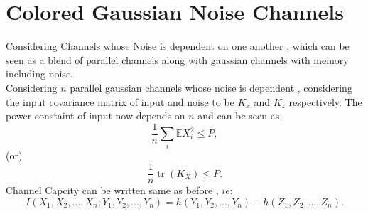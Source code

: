 \section{Colored Gaussian Noise Channels}
Considering Channels whose Noise is dependent on one another , which can be seen as a blend of parallel channels along with gaussian channels with memory including noise.
\\
Considering $n$ parallel gaussian channels whose noise is dependent , considering the input covariance matrix of input and noise to be $K_x$ and $K_z$ respectively. The power constaint of input now depends on $n$ and can be seen as,
\begin{equation}
\frac{1}{n} \sum_i \mathbb{E}X_i^2 \leq P,
\tag{10.77}
\end{equation}
(or)
\begin{equation}
\frac{1}{n} \operatorname{tr}(K_X) \leq P.
\tag{10.78}
\end{equation}
Channel Capcity can be written same as before , $ie$:
\begin{equation}
I(X_1, X_2, \ldots, X_n ; Y_1, Y_2, \ldots, Y_n) = h(Y_1, Y_2, \ldots, Y_n) - h(Z_1, Z_2, \ldots, Z_n).
\tag{10.79}
\end{equation}


